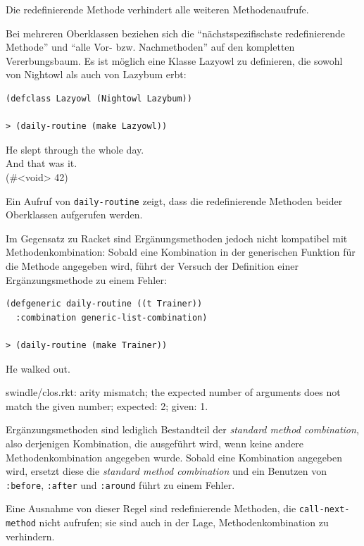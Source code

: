 Die redefinierende Methode verhindert alle weiteren Methodenaufrufe. 

Bei mehreren Oberklassen beziehen sich die ``nächstspezifischste redefinierende Methode'' und ``alle Vor- bzw. Nachmethoden'' auf den kompletten Vererbungsbaum. Es ist möglich eine Klasse Lazyowl zu definieren, die sowohl von Nightowl als auch von Lazybum erbt:

\begin{lstlisting}
(defclass Lazyowl (Nightowl Lazybum))

> (daily-routine (make Lazyowl))
\end{lstlisting}
{\routput He slept through the whole day.\\
\phantom{.}And that was it.\\
\phantom{.}(\#<void> 42)}

Ein Aufruf von \texttt{daily-routine} zeigt, dass die redefinierende Methoden beider Oberklassen aufgerufen werden. 

Im Gegensatz zu Racket sind Ergänungsmethoden jedoch nicht kompatibel mit Methodenkombination: Sobald eine Kombination in der generischen Funktion für die Methode angegeben wird, führt der Versuch der Definition einer Ergänzungsmethode zu einem Fehler:

\begin{lstlisting}
(defgeneric daily-routine ((t Trainer))
  :combination generic-list-combination)
  
> (daily-routine (make Trainer))
\end{lstlisting}
{\routput He walked out.}

\vspace{-0.3cm}
{\rerror swindle/clos.rkt: arity mismatch; the expected number of arguments does not match the given number; expected: 2; given: 1.}

Ergänzungsmethoden sind lediglich Bestandteil der \emph{standard method combination}, also derjenigen Kombination, die ausgeführt wird, wenn keine andere Methodenkombination angegeben wurde. Sobald eine Kombination angegeben wird, ersetzt diese die \textit{standard method combination} und ein Benutzen von \texttt{:before}, \texttt{:after} und \texttt{:around} führt zu einem Fehler.

Eine Ausnahme von dieser Regel sind redefinierende Methoden, die \texttt{call-next-method} nicht aufrufen; sie sind auch in der Lage, Methodenkombination zu verhindern.

